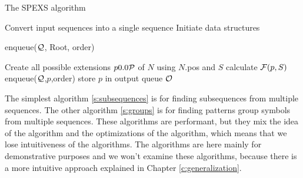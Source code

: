 \begin{algorithm}
	\caption{The SPEXS algorithm}
	\label{s:general}
\begin{algorithmic}[1]

	\State Convert input sequences into a single sequence
	\State Initiate data structures

	\State enqueue($\mathcal{Q}$, Root, order)

		\State Create all possible extensions $p \in \sym{P}$ of $N$ using $N$.pos and $S$
				\State calculate $\mathcal{F}(p,S)$
				\State enqueue($\mathcal{Q}$,$p$,order)
					\State store $p$ in output queue $\mathcal{O}$
				\EndIf
			\EndIf
		\EndFor
	\EndWhile
\end{algorithmic}
\end{algorithm}

The simplest algorithm \ref{s:subsequences} is for finding subsequences from multiple sequences. The other algorithm \ref{s:groups} is for finding patterns group symbols from multiple sequences. These algorithms are performant, but they mix the idea of the algorithm and the optimizations of the algorithm, which means that we lose intuitiveness of the algorithms. The algorithms are here mainly for demonstrative purposes and we won't examine these algorithms, because there is a more intuitive approach explained in Chapter \ref{c:generalization}. 


